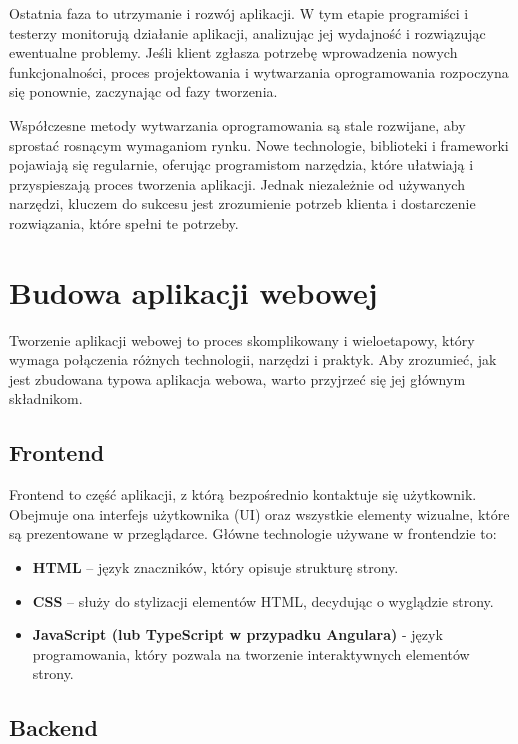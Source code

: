 Ostatnia faza to utrzymanie i rozwój aplikacji. W tym etapie programiści i testerzy monitorują działanie aplikacji, analizując jej wydajność i rozwiązując ewentualne problemy. Jeśli klient zgłasza potrzebę wprowadzenia nowych funkcjonalności, proces projektowania i wytwarzania oprogramowania rozpoczyna się ponownie, zaczynając od fazy tworzenia.

Współczesne metody wytwarzania oprogramowania są stale rozwijane, aby sprostać rosnącym wymaganiom rynku. Nowe technologie, biblioteki i frameworki pojawiają się regularnie, oferując programistom narzędzia, które ułatwiają i przyspieszają proces tworzenia aplikacji. Jednak niezależnie od używanych narzędzi, kluczem do sukcesu jest zrozumienie potrzeb klienta i dostarczenie rozwiązania, które spełni te potrzeby.


\section{Budowa aplikacji webowej}

Tworzenie aplikacji webowej to proces skomplikowany i wieloetapowy, który wymaga połączenia różnych technologii, narzędzi i praktyk. Aby zrozumieć, jak jest zbudowana typowa aplikacja webowa, warto przyjrzeć się jej głównym składnikom.
\cite{budowaAplikacji}

\subsection{Frontend}

Frontend to część aplikacji, z którą bezpośrednio kontaktuje się użytkownik. Obejmuje ona interfejs użytkownika (UI) oraz wszystkie elementy wizualne, które są prezentowane w przeglądarce. Główne technologie używane w frontendzie to:

\begin{itemize}
\item \textbf{HTML} -- język znaczników, który opisuje strukturę strony.
\item \textbf{CSS} -- służy do stylizacji elementów HTML, decydując o wyglądzie strony.
\item \textbf{JavaScript (lub TypeScript w przypadku Angulara)} - język programowania, który pozwala na tworzenie interaktywnych elementów strony.
\end{itemize}

\subsection{Backend}

